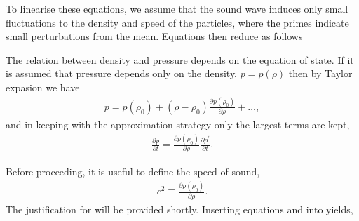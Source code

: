 To linearise these equations, we assume that the sound wave induces only small fluctuations to the density and speed of the particles,
where the primes indicate  small perturbations from the mean.
Equations  then reduce as follows

The relation between density and pressure depends on the equation of state.  
If it is assumed that pressure depends only on the density, $p=p(\rho)$
then by Taylor expasion we have
\begin{align}
p = p(\rho_0) + (\rho-\rho_0) \frac{\partial p(\rho_0)}{\partial \rho} + \ldots,
\end{align}
and in keeping with the approximation strategy only the largest terms are kept,
\begin{align}
  \label{eqn:taylorLargest}
 \frac{\partial p}{\partial t} = \frac{\partial p(\rho_0)}{\partial \rho} \frac{\partial \rho^\prime}{\partial t}.
\end{align}

Before proceeding, it is useful to define the speed of sound,
\begin{align}
  \label{eqn:csquaredApprox}
c^2 \equiv \frac{\partial p(\rho_0)}{\partial \rho}.
\end{align}
The justification for  will be provided shortly.
%
Inserting equations  and  into  yields,

